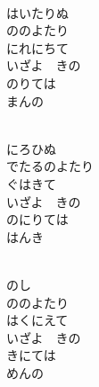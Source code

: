 \documentclass[10pt,b5j]{tarticle} %
\begin{document}
\vspace{1.5em} %
\newcommand{\linespace}{0.5em} %
\newcommand{\blocksize}{0.5\hsize} %
\newcommand{\itemmargin}{6em} %
\begin{enumerate} %
    \setlength{\itemindent}{\itemmargin} %
    \begin{minipage}[c]{\blocksize}
    
        \vspace{\linespace}
        \item~\\
        はいたりぬ\\
        ののよたり\\
        にれにちて\\
        いざよ　きの\\
        のりては\\
        まんの
        
        \vspace{\linespace}
        \item~\\
        にろひぬ\\
        でたるのよたり\\
        ぐはきて\\
        いざよ　きの\\
        のにりては\\
        はんき
        
        \vspace{\linespace}
        \item~\\
        のし\\
        ののよたり\\
        はくにえて\\
        いざよ　きの\\
        きにては\\
        めんの
    
    \end{minipage}
\end{enumerate} %
\end{document}
